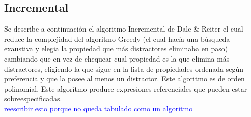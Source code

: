 

\subsection{Incremental}

Se describe a continuaci\'on el algoritmo Incremental de Dale \& Reiter el cual reduce la complejidad del algoritmo Greedy (el cual hac\'ia una b\'usqueda exaustiva y elegia la propiedad que m\'as distractores eliminaba en paso) cambiando que en vez de chequear cual propiedad es la que elimina m\'as distractores, eligiendo la que sigue en la lista de propiedades ordenada seg\'un preferencia y que la posee al menos un distractor. Este algoritmo es de orden polinomial. Este algoritmo produce expresiones referenciales que pueden estar sobreespecificadas.\\

\textcolor{blue}{reescribir esto porque no queda tabulado como un algoritmo}


